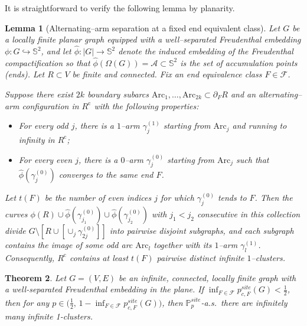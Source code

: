 \documentclass[11pt]{amsart}
\theoremstyle{plain}
\newtheorem{theorem}{Theorem}[section]
\newtheorem{lemma}[theorem]{Lemma}
\numberwithin{equation}{section}
\numberwithin{figure}{section}
\renewcommand\ell{l}
\begin{document}
It is straightforward to verify the following lemma by planarity.
\begin{lemma}[Alternating--arm separation at a fixed end equivalent class]\label{lem:sep}
Let $G$ be a locally finite planar graph equipped with a well--separated
Freudenthal embedding $\phi\colon G\hookrightarrow\mathbb S^2$, and let
$\widehat\phi\colon|G|\to\mathbb S^2$ denote the induced embedding of the
Freudenthal compactification so that $\widehat\phi(\Omega(G))=\mathcal{A}\subset\mathbb S^2$
is the set of accumulation points (ends). Let $R\subset V$ be finite and connected.
Fix an end equivalence class $F\in \mathcal{F}$.

Suppose there exist $2k$ boundary subarcs
$\mathrm{Arc}_1,\ldots,\mathrm{Arc}_{2k}\subset\partial_{F}R$ and an
alternating--arm configuration in $R^{\mathrm c}$ with the following
properties:
\begin{itemize}
\item For every odd $j$, there is a $1$--arm $\gamma^{(1)}_j$ starting from
$\mathrm{Arc}_j$ and running to infinity in $R^{\mathrm c}$;
\item For every even $j$, there is a $0$--arm $\gamma^{(0)}_j$ starting from
$\mathrm{Arc}_j$ such that $\widehat\phi(\gamma^{(0)}_j)$ converges to the same end $F$.
\end{itemize}
Let $t(F)$ be the number of even indices $j$ for which $\gamma^{(0)}_j$ tends to $F$.
Then the curves $\phi(R)\cup \widehat\phi(\gamma^{(0)}_{j_1})\cup
\widehat\phi(\gamma^{(0)}_{j_2})$ with $j_1<j_2$ consecutive in this collection
divide $G\setminus [R\cup[\cup_{j}\gamma_{2j}^{(0)}]]$ into pairwise disjoint subgraphs, and each subgraph contains the image of
some odd arc $\mathrm{Arc}_{\ell}$ together with its $1$--arm $\gamma^{(1)}_{\ell}$.
Consequently, $R^{\mathrm c}$ contains at least $t(F)$
pairwise distinct infinite $1$--clusters.
\end{lemma}





\begin{theorem}\label{thm:main}
Let $G=(V,E)$ be an infinite, connected, locally finite graph with a well-separated Freudenthal embedding in the plane. If $\inf_{F\in\mathcal{F}} p_{c,F}^{site}(G)<\tfrac12$, then for any $p\in\big(\tfrac12,\,1-\inf_{F\in\mathcal{F}} p_{c,F}^{site}(G)\big)$, then $\mathbb{P}_{p}^{site}$-a.s.~there are infinitely many infinite 1-clusters.
\end{theorem}
\end{document}
